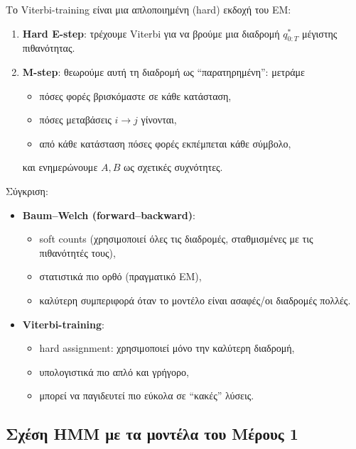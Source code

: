 \documentclass[a4paper,11pt]{article}
\begin{document}
Το Viterbi-training είναι μια απλοποιημένη (hard) εκδοχή του EM:

\begin{enumerate}
  \item \textbf{Hard E-step}: τρέχουμε Viterbi για να βρούμε μια διαδρομή
        $q_{0:T}^\ast$ μέγιστης πιθανότητας.
  \item \textbf{M-step}: θεωρούμε αυτή τη διαδρομή ως ``παρατηρημένη'':
        μετράμε
        \begin{itemize}
          \item πόσες φορές βρισκόμαστε σε κάθε κατάσταση,
          \item πόσες μεταβάσεις $i\to j$ γίνονται,
          \item από κάθε κατάσταση πόσες φορές εκπέμπεται κάθε σύμβολο,
        \end{itemize}
        και ενημερώνουμε $A,B$ ως σχετικές συχνότητες.
\end{enumerate}

Σύγκριση:
\begin{itemize}
  \item \textbf{Baum–Welch (forward–backward)}:
        \begin{itemize}
          \item soft counts (χρησιμοποιεί όλες τις διαδρομές, σταθμισμένες με τις πιθανότητές τους),
          \item στατιστικά πιο ορθό (πραγματικό EM),
          \item καλύτερη συμπεριφορά όταν το μοντέλο είναι ασαφές/οι διαδρομές πολλές.
        \end{itemize}
  \item \textbf{Viterbi-training}:
        \begin{itemize}
          \item hard assignment: χρησιμοποιεί μόνο την καλύτερη διαδρομή,
          \item υπολογιστικά πιο απλό και γρήγορο,
          \item μπορεί να παγιδευτεί πιο εύκολα σε ``κακές'' λύσεις.
        \end{itemize}
\end{itemize}

\subsection{Σχέση HMM με τα μοντέλα του Μέρους 1}
\end{document}
